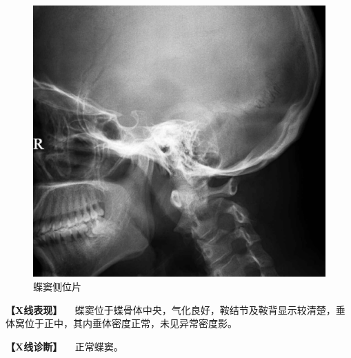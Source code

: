 \begin{figure}[!htbp]
 \centering
 \includegraphics{./images/Image00415.jpg}
 \captionsetup{justification=centering}
 \caption{蝶窦侧位片}
 \label{fig7-1-5}
  \end{figure} 

\textbf{【X线表现】}
　蝶窦位于蝶骨体中央，气化良好，鞍结节及鞍背显示较清楚，垂体窝位于正中，其内垂体密度正常，未见异常密度影。

\textbf{【X线诊断】} 　正常蝶窦。

